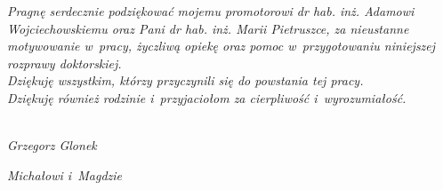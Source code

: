 \cleardoublepage
{}
{}
\vspace*{\fill}



\textit{Pragnę serdecznie podziękować mojemu promotorowi dr hab. inż. Adamowi Wojciechowskiemu oraz Pani dr hab. inż. Marii Pietruszce, za nieustanne motywowanie w~pracy, życzliwą opiekę oraz pomoc w~przygotowaniu niniejszej rozprawy doktorskiej.}\\
\textit{Dziękuję wszystkim, którzy przyczynili się do powstania tej pracy.}\\
\textit{Dziękuję również rodzinie i~przyjaciołom za cierpliwość i~wyrozumiałość.}\\\\
\begin{flushright}
	\textit{Grzegorz Glonek}
\end{flushright}
\vspace*{\fill}

\cleardoublepage
{}
{}
\vspace*{\fill}
\begin{flushright}
	\textit{Michałowi i~Magdzie}
\end{flushright}
\vspace*{\fill}